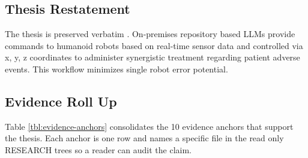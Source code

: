 %
%

\begin{sectionaccent}

\subsection{Thesis Restatement}
\label{sec:conclusions-thesis}

The thesis is preserved verbatim
\cite{kawchak_2026_humanoid_instructions}. On-premises repository
based LLMs provide commands to humanoid robots based on real-time
sensor data and controlled via x, y, z coordinates to administer
synergistic treatment regarding patient adverse events. This
workflow minimizes single robot error potential.

\subsection{Evidence Roll Up}
\label{sec:conclusions-evidence}

Table \ref{tbl:evidence-anchors} consolidates the 10 evidence anchors
that support the thesis. Each anchor is one row and
names a specific file in the read only RESEARCH trees so a reader
can audit the claim.



\end{sectionaccent}
